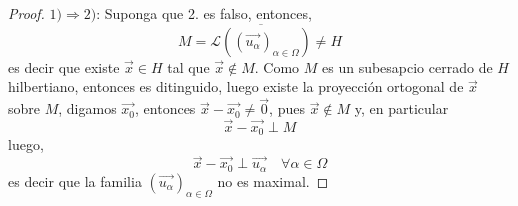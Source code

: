 \documentclass[12pt]{report}
\theoremstyle{largebreak}
\begin{document}
    \begin{proof}
        $1)\Rightarrow 2)$: Suponga que 2. es falso, entonces,
        \begin{equation*}
            M=\overline{\mathcal{L}\left(\left(\vec{u_\alpha} \right)_{\alpha\in\Omega}\right)}\neq H
        \end{equation*}
        es decir que existe $\vec{x}\in H$ tal que $\vec{x}\notin M$. Como $M$ es un subesapcio cerrado de $H$ hilbertiano, entonces es ditinguido, luego existe la proyección ortogonal de $\vec{x}$ sobre $M$, digamos $\vec{x_0}$, entonces $\vec{x}-\vec{x_0}\neq\vec{0}$, pues $\vec{x}\notin M$ y, en particular
        \begin{equation*}
            \vec{x}-\vec{x_0}\perp M
        \end{equation*}
        luego,
        \begin{equation*}
            \vec{x}-\vec{x_0}\perp\vec{u_\alpha}\quad\forall\alpha\in\Omega
        \end{equation*}
        es decir que la familia $\left(\vec{u_\alpha} \right)_{\alpha\in\Omega}$ no es maximal.


\end{proof}
\end{document}
